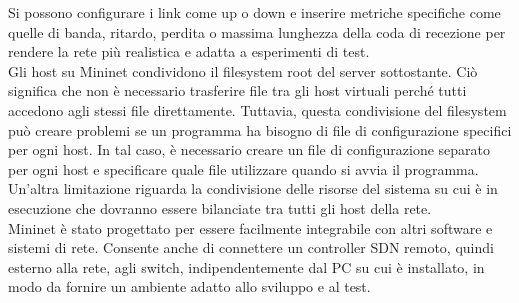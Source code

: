 Si possono configurare i link come up o down e inserire metriche specifiche 
come quelle di banda, ritardo, perdita o massima lunghezza della coda di recezione per rendere la rete più realistica e adatta a esperimenti di test.
\\Gli host su Mininet condividono il filesystem root del server sottostante. 
Ciò significa che non è necessario trasferire file tra gli host virtuali perché tutti accedono agli stessi file direttamente.
Tuttavia, questa condivisione del filesystem può creare problemi se un programma ha bisogno di file di configurazione specifici per ogni host. 
In tal caso, è necessario creare un file di configurazione separato per ogni host e specificare quale file utilizzare quando si avvia il programma.
Un'altra limitazione riguarda la condivisione delle risorse del sistema su cui è in esecuzione che dovranno essere bilanciate tra tutti gli host della rete.
\\Mininet è stato progettato per essere facilmente integrabile con altri software e sistemi di rete.
Consente anche di connettere un controller SDN remoto, quindi esterno alla rete, agli switch, indipendentemente dal PC su cui è installato, in modo da fornire un ambiente adatto allo sviluppo e al test.


